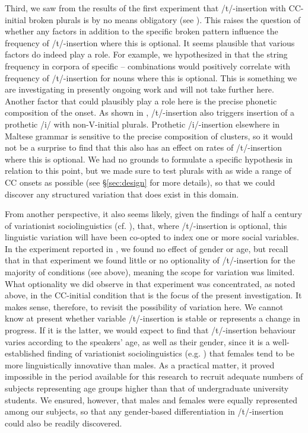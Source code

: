 \documentclass[output=paper]{langsci/langscibook}
\begin{document}
\newpage 
Third, we saw from the results of the first experiment that /t/-insertion with CC-initial  broken plurals is by no means obligatory (see ). This raises the question of whether any factors in addition to the specific broken  pattern influence the frequency of /t/-insertion where this is optional. It seems plausible that various factors do indeed play a role. For example, we hypothesized in \citet{LucasSpagnol2016} that the string frequency in corpora \citep{Krug1998} of specific – combinations would positively correlate with frequency of /t/-insertion for nouns where this is optional. This is something we are investigating in presently ongoing work and will not take further here. Another factor that could plausibly play a role here is the precise phonetic composition of the onset. As shown in ‎, /t/-insertion also triggers insertion of a prothetic /i/ with non-V-initial plurals. Prothetic /i/-insertion elsewhere in Maltese grammar is sensitive to the precise composition of  clusters, so it would not be a surprise to find that this also has an effect on rates of /t/-insertion where this is optional. We had no grounds to formulate a specific hypothesis in relation to this point, but we made sure to test plurals with as wide a range of CC onsets as possible (see §\ref{sec:design} for more details), so that we could discover any structured variation that does exist in this domain.

From another perspective, it also seems likely, given the findings of half a century of variationist sociolinguistics (cf. \citealt{Chambers2003}), that, where /t/-insertion is optional, this linguistic variation will have been co-opted to index one or more social variables. In the experiment reported in \citet{LucasSpagnol2016}, we found no effect of gender or age, but recall that in that experiment we found little or no optionality of /t/-insertion for the majority of conditions (see  above), meaning the scope for  variation was limited. What optionality we did observe in that experiment was concentrated, as noted above, in the CC-initial  condition that is the focus of the present investigation. It makes sense, therefore, to revisit the possibility of  variation here. We cannot know at present whether variable /t/-insertion is stable or represents a change in progress. If it is the latter, we would expect to find that /t/-insertion behaviour varies according to the speakers’ age, as well as their gender, since it is a well-established finding of variationist sociolinguistics (e.g. \citealt{Labov2001}) that females tend to be more linguistically innovative than males. As a practical matter, it proved impossible in the period available for this research to recruit adequate numbers of subjects representing age groups higher than that of undergraduate university students. We ensured, however, that males and females were equally represented among our subjects, so that any gender-based differentiation in /t/-insertion could also be readily discovered.
\end{document}
